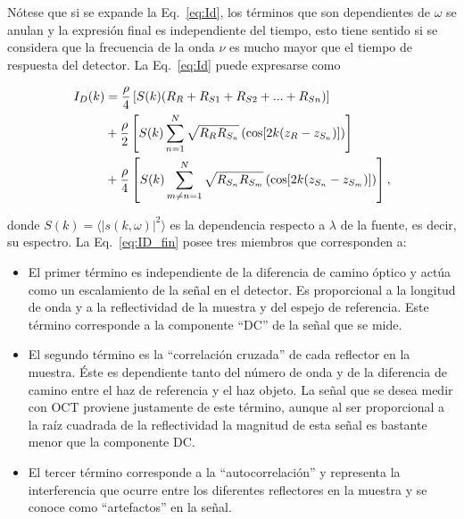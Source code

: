 Nótese que si se expande la Eq.~\ref{eq:Id}, los términos que son dependientes de $\omega$ se anulan y la expresión final es independiente del tiempo, esto tiene sentido si se considera que la frecuencia de la onda $\nu$ es mucho mayor que el tiempo de respuesta del detector. La Eq.~\ref{eq:Id} puede expresarse como

%
%

\begin{align}
\label{eq:ID_fin}
	I_D(k) &= \frac{\rho}{4}\left[ S(k) (R_R + R_{S1} + R_{S2} + ...+R_{Sn}) \right] \notag \\
	& + \frac{\rho}{2} \left[ S(k) \sum_{n=1}^{N} \sqrt{R_R R_{S_n}} \left( \cos[2k(z_R - z_{S_n})] \right) \right] \\
	& + \frac{\rho}{4} \left[ S(k) \sum_{m\neq n=1}^{N} \sqrt{R_{S_n}R_{S_m}} \left( \cos[2k(z_{S_n} - z_{S_m})] \right) \right], \notag
\end{align}

\noindent donde $S(k) = \langle |s(k,\omega)|^2 \rangle$ es la dependencia respecto a $\lambda$ de la fuente, es decir, su espectro. La Eq.~\ref{eq:ID_fin} posee tres miembros que corresponden a:

\begin{itemize}
	\item El primer término es independiente de la diferencia de camino óptico y actúa como un escalamiento de la señal en el detector. Es proporcional a la longitud de onda y a la reflectividad de la muestra y del espejo de referencia. Este término corresponde a la componente ``DC'' de la señal que se mide.
	\item El segundo término es la ``correlación cruzada'' de cada reflector en la muestra. Éste es dependiente tanto del número de onda y de la diferencia de camino entre el haz de referencia y el haz objeto. La señal que se desea medir con OCT proviene justamente de este término, aunque al ser proporcional a la raíz cuadrada de la reflectividad la magnitud de esta señal es bastante menor que la componente DC.
	\item El tercer término corresponde a la ``autocorrelación'' y representa la interferencia que ocurre entre los diferentes reflectores en la muestra y se conoce como ``artefactos'' en la señal.
\end{itemize}

